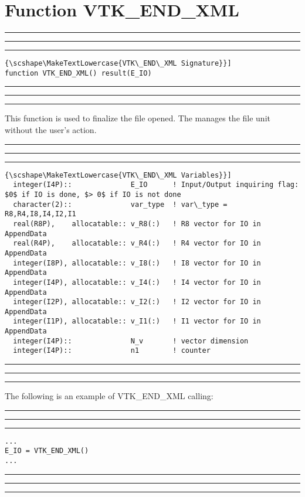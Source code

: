 \documentclass[pagesize=pdftex,fontsize=10pt,paper=a4,oneside]{scrbook}
\DeclareRobustCommand{\MarginNote}[1]{\marginpar{%
\slshape\footnotesize%
\parindent=0pt\lineskip=0pt\lineskiplimit=0pt%
\tolerance=2000\hyphenpenalty=300\exhyphenpenalty=300%
\doublehyphendemerits=100000\finalhyphendemerits=\doublehyphendemerits%
\raggedright\hspace{0pt}#1}}
\newenvironment{boxred}[1]%
               {%
                \noindent\hspace*{-0.025\textwidth}%
                \color{Maroon}%
                \rule[-5.8pt]{0.6pt}{6pt}\hspace*{-0.6pt}\rule{1.05\textwidth}{0.6pt}\hspace*{-0.6pt}\rule[-5.8pt]{0.6pt}{6pt}%
                \color{black}%
                \vspace*{0.6pt}\MarginNote{\color{Maroon}{#1}}%
               }%
               {%
                \noindent\hspace*{-0.025\textwidth}%
                \color{Maroon}%
                \rule[0pt]{0.6pt}{6pt}\hspace*{-0.6pt}\rule{1.05\textwidth}{0.6pt}\hspace*{-0.6pt}\rule[0pt]{0.6pt}{6pt}%
                \color{black}%
                \vspace*{2mm}%
               }
\DeclareRobustCommand{\MaiuscolettoBS}[1]{\textls[80]{\scshape\MakeTextLowercase{#1}}}
\begin{document}
\section{Function VTK\_END\_XML}
\label{fun:VTK_END_XML}
 
 
\begin{boxred}{}
\begin{lstlisting}[style=signature,title=\color{Maroon}\MaiuscolettoBS{VTK\_END\_XML Signature}]
function VTK_END_XML() result(E_IO)
\end{lstlisting}
\end{boxred}
 
This function is used to finalize the file opened. The \LIBVTKIO manages the file unit without the user's action.


 
\begin{boxred}{}
\begin{lstlisting}[style=variables,title=\color{Maroon}\MaiuscolettoBS{VTK\_END\_XML Variables}]
  integer(I4P)::              E_IO      ! Input/Output inquiring flag: $0$ if IO is done, $> 0$ if IO is not done
  character(2)::              var_type  ! var\_type = R8,R4,I8,I4,I2,I1
  real(R8P),    allocatable:: v_R8(:)   ! R8 vector for IO in AppendData
  real(R4P),    allocatable:: v_R4(:)   ! R4 vector for IO in AppendData
  integer(I8P), allocatable:: v_I8(:)   ! I8 vector for IO in AppendData
  integer(I4P), allocatable:: v_I4(:)   ! I4 vector for IO in AppendData
  integer(I2P), allocatable:: v_I2(:)   ! I2 vector for IO in AppendData
  integer(I1P), allocatable:: v_I1(:)   ! I1 vector for IO in AppendData
  integer(I4P)::              N_v       ! vector dimension
  integer(I4P)::              n1        ! counter
\end{lstlisting}

\end{boxred}
 
The following is an example of VTK\_END\_XML calling:

\begin{boxred}{VTK\_END\_XML Calling}
\begin{verbatim}
...
E_IO = VTK_END_XML()
...
\end{verbatim}
\end{boxred}

\appendix





\printindex
\end{document}

